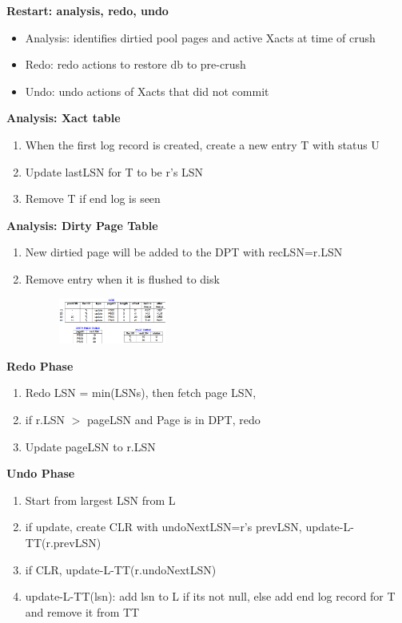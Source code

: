 \documentclass[10pt, landscape]{article}
\begin{document}
\begin{multicols}{4}
\textbf{Restart: analysis, redo, undo} \\
\begin{itemize}
  \item Analysis: identifies dirtied pool pages and active Xacts at time of crush
  \item Redo: redo actions to restore db to pre-crush
  \item Undo: undo actions of Xacts that did not commit
\end{itemize}

\textbf{Analysis: Xact table} \\
\begin{enumerate}
  \item When the first log record is created, create a new entry T with status U
  \item Update lastLSN for T to be r's LSN
  \item Remove T if end log is seen
\end{enumerate}

\textbf{Analysis: Dirty Page Table} \\
\begin{enumerate}
  \item New dirtied page will be added to the DPT with recLSN=r.LSN
  \item Remove entry when it is flushed to disk
\end{enumerate}

\includegraphics[width=7cm, height =1.5cm]{analysis_log.png}

\textbf{Redo Phase} \\
\begin{enumerate}
  \item Redo LSN = min(LSNs), then fetch page LSN, 
  \item if r.LSN $>$ pageLSN and Page is in DPT, redo
  \item Update pageLSN to r.LSN
\end{enumerate}

\textbf{Undo Phase} \\
\begin{enumerate}
  \item Start from largest LSN from L
  \item if update, create CLR with undoNextLSN=r's prevLSN, update-L-TT(r.prevLSN)
  \item if CLR, update-L-TT(r.undoNextLSN)
  \item update-L-TT(lsn): add lsn to L if its not null, else add end log record for T and remove it from TT
\end{enumerate}

\end{multicols}
\end{document}
